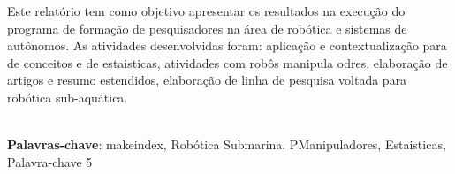 \begin{thesisresumo}
    Este relatório tem como objetivo apresentar os resultados na execução do programa de formação de pesquisadores  na área de robótica e sistemas de autônomos. As atividades desenvolvidas foram: aplicação e contextualização para de conceitos e de estaisticas, atividades com robôs manipula odres, elaboração de artigos e resumo estendidos, elaboração de linha de pesquisa voltada para robótica sub-aquática.

\ \\


\textbf{Palavras-chave}: makeindex, Robótica Submarina, PManipuladores, Estaisticas, Palavra-chave 5

\end{thesisresumo}
